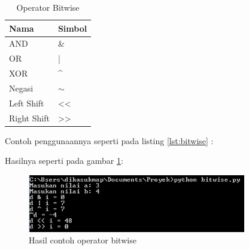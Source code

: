 \begin{table}[]
\caption{Operator Bitwise}
\label{tab:my-table}
\begin{tabular}{|l|l|}
\hline
Nama        & Simbol                       \\ \hline
AND         & \&                           \\ \hline
OR          & |                            \\ \hline
XOR         & \textasciicircum{}           \\ \hline
Negasi      & $\sim$                       \\ \hline
Left Shift  & \textless{}\textless{}       \\ \hline
Right Shift & \textgreater{}\textgreater{} \\ \hline
\end{tabular}
\end{table}

Contoh penggunaannya seperti pada listing \ref{lst:bitwise} :


Hasilnya seperti pada gambar \ref{fig:bitwise}:
\begin{figure}[!htbp]
	\centerline{\includegraphics[width=0.85\textwidth]{figures/2/bitwise.PNG}}
	\caption{Hasil contoh operator bitwise}
	\label{fig:bitwise}
\end{figure}

